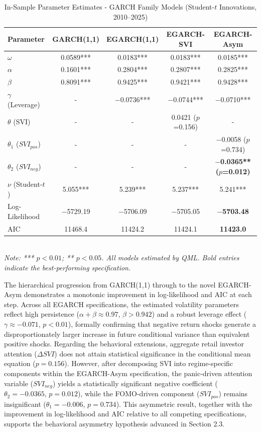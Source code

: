\documentclass[12pt, a4paper]{article}
\begin{document}
\begin{table}[H]
\centering
\caption{In-Sample Parameter Estimates - GARCH Family Models (Student-$t$ Innovations, 2010–2025)}
\label{tab:insample}
\small
\begin{tabular}{lcccc}
\toprule
Parameter & GARCH(1,1) & EGARCH(1,1) & EGARCH-SVI & EGARCH-Asym \\
\midrule
$\omega$               & 0.0589*** & 0.0183*** & 0.0183*** & 0.0185*** \\
$\alpha$               & 0.1601*** & 0.2804*** & 0.2807*** & 0.2825*** \\
$\beta$                & 0.8091*** & 0.9425*** & 0.9421*** & 0.9428*** \\
$\gamma$ (Leverage)    & -       & $-$0.0736*** & $-$0.0744*** & $-$0.0710*** \\
$\theta$ (SVI)         & -       & -       & 0.0421 ($p$=0.156)  & -                   \\
$\theta_1$ ($SVI_{pos}$) & -     & -       & -       & $-$0.0058 ($p$=0.734) \\
$\theta_2$ ($SVI_{neg}$) & -     & -       & -       & \textbf{$-$0.0365** ($p$=0.012)} \\
$\nu$ (Student-$t$)    & 5.055***  & 5.239***  & 5.237***  & 5.241***  \\
\midrule
Log-Likelihood & $-$5729.19 & $-$5706.09 & $-$5705.05 & \textbf{$-$5703.48} \\
AIC            & 11468.4   & 11424.2   & 11424.1   & \textbf{11423.0} \\
\bottomrule
\end{tabular}
\smallskip\\
\footnotesize\textit{Note: *** $p<0.01$; ** $p<0.05$. All models estimated by QML. Bold entries indicate the best-performing specification.}
\end{table}

The hierarchical progression from GARCH(1,1) through to the novel EGARCH-Asym demonstrates a monotonic improvement in log-likelihood and AIC at each step. Across all EGARCH specifications, the estimated volatility parameters reflect high persistence ($\alpha + \beta \approx 0.97$, $\beta > 0.942$) and a robust leverage effect ($\gamma \approx -0.071$, $p < 0.01$), formally confirming that negative return shocks generate a disproportionately larger increase in future conditional variance than equivalent positive shocks. Regarding the behavioral extensions, aggregate retail investor attention ($\Delta SVI$) does not attain statistical significance in the conditional mean equation ($p = 0.156$). However, after decomposing SVI into regime-specific components within the EGARCH-Asym specification, the panic-driven attention variable ($SVI_{neg}$) yields a statistically significant negative coefficient ($\theta_2 = -0.0365$, $p = 0.012$), while the FOMO-driven component ($SVI_{pos}$) remains insignificant ($\theta_1 = -0.006$, $p = 0.734$). This asymmetric result, together with the improvement in log-likelihood and AIC relative to all competing specifications, supports the behavioral asymmetry hypothesis advanced in Section 2.3.
\end{document}

